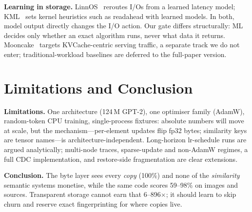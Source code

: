 \documentclass[sigconf,10pt,anonymous,review]{acmart}
\begin{document}
\textbf{Learning in storage.} LinnOS~\cite{linnos} reroutes I/Os from a
learned latency model; KML~\cite{kml} sets kernel heuristics such as
readahead with learned models. In both, model output directly changes the
I/O action. Our gate differs structurally: ML decides only whether an
exact algorithm runs, never what data it returns. Mooncake~\cite{mooncake}
targets KVCache-centric serving traffic, a separate track we do not
enter; traditional-workload baselines are deferred to the full-paper
version.

\section{Limitations and Conclusion}
\label{sec:limitations}

\textbf{Limitations.} One architecture (124\,M GPT-2), one optimiser
family (AdamW), random-token CPU training, single-process fixtures:
absolute numbers will move at scale, but the mechanism---per-element
updates flip fp32 bytes; similarity keys are tensor names---is
architecture-independent. Long-horizon lr-schedule runs are argued
analytically; multi-node traces, sparse-update and non-AdamW regimes, a
full CDC implementation, and restore-side fragmentation are clear
extensions.

\textbf{Conclusion.} The
byte layer sees every \emph{copy} (100\%) and none of the \emph{similarity}
semantic systems monetise, while the same code scores 59--98\% on images
and sources. Transparent storage cannot earn that 6--896$\times$; it
should learn to skip churn and reserve exact fingerprinting for where
copies live.




\end{document}
